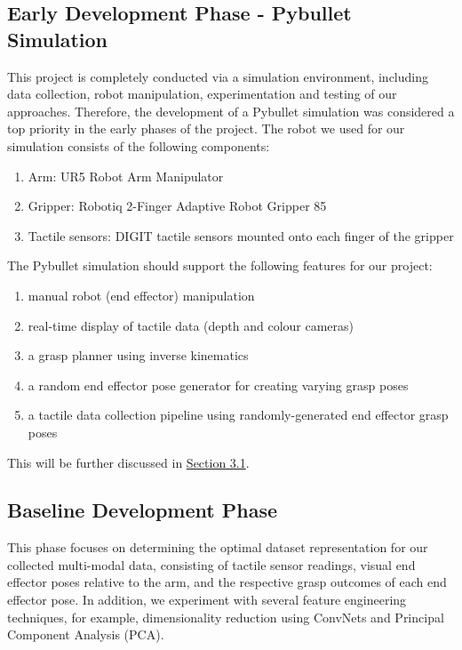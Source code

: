 \documentclass[11pt, a4paper]{report}
\begin{document}
\subsection{Early Development Phase - Pybullet Simulation}\label{sec:1.4.2}
This project is completely conducted via a simulation environment, including data collection, robot manipulation, experimentation and testing of our approaches. Therefore, the development of a Pybullet simulation was considered a top priority in the early phases of the project. The robot we used for our simulation consists of the following components:
\begin{enumerate}
    \item Arm: UR5 Robot Arm Manipulator
    \item Gripper: Robotiq 2-Finger Adaptive Robot Gripper 85
    \item Tactile sensors: DIGIT tactile sensors \cite{Lambeta2020DIGIT} mounted onto each finger of the gripper
\end{enumerate}
The Pybullet simulation should support the following features for our project:
\begin{enumerate}
    \item manual robot (end effector) manipulation
    \item real-time display of tactile data (depth and colour cameras)
    \item a grasp planner using inverse kinematics
    \item a random end effector pose generator for creating varying grasp poses
    \item a tactile data collection pipeline using randomly-generated end effector grasp poses
\end{enumerate}
\noindent This will be further discussed in \hyperref[sec:3.1]{Section 3.1}.


\subsection{Baseline Development Phase}\label{sec:1.4.3}
This phase focuses on determining the optimal dataset representation for our collected multi-modal data, consisting of tactile sensor readings, visual end effector poses relative to the arm, and the respective grasp outcomes of each end effector pose. In addition, we experiment with several feature engineering techniques, for example, dimensionality reduction using ConvNets and Principal Component Analysis (PCA).
\end{document}
